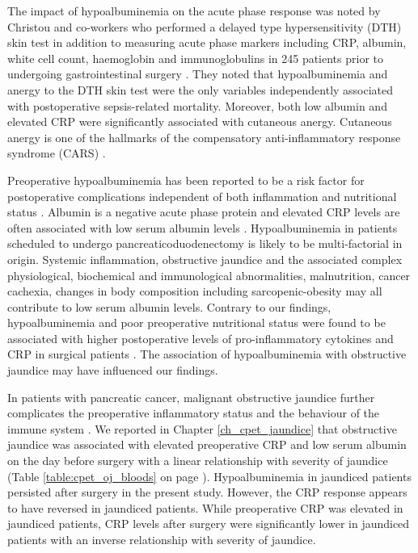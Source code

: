 The impact of hypoalbuminemia on the acute phase response was noted by Christou and co-workers who performed a delayed type hypersensitivity (DTH) skin test in addition to measuring acute phase markers including CRP, albumin, white cell count, haemoglobin and immunoglobulins in 245 patients prior to undergoing gastrointestinal surgery \parencite{christou_estimating_1989}.
They noted that hypoalbuminemia and anergy to the DTH skin test were the only variables independently associated with postoperative sepsis-related mortality.
Moreover, both low albumin and elevated CRP were significantly associated with cutaneous anergy.
Cutaneous anergy is one of the hallmarks of the compensatory anti-inflammatory response syndrome (CARS) \parencite{ward_compensatory_2008}.

Preoperative hypoalbuminemia has been reported to be a risk factor for postoperative complications independent of both inflammation and nutritional status \parencite{gibbs_preoperative_1999, don_poor_2004, hennessey_preoperative_2010}.
Albumin is a negative acute phase protein and elevated CRP levels are often associated with low serum albumin levels \parencite{margarson_serum_1998}. 
Hypoalbuminemia in patients scheduled to undergo pancreaticoduodenectomy is likely to be multi-factorial in origin. 
Systemic inflammation, obstructive jaundice and the associated complex physiological, biochemical and immunological abnormalities, malnutrition, cancer cachexia, changes in body composition including sarcopenic-obesity may all contribute to low serum albumin levels. 
Contrary to our findings, hypoalbuminemia and poor preoperative nutritional status were found to be associated with higher postoperative levels of pro-inflammatory cytokines and CRP in surgical patients \parencite{nakamura_influence_1999}.
The association of hypoalbuminemia with obstructive jaundice may have influenced our findings. 

In patients with pancreatic cancer, malignant obstructive jaundice further complicates the preoperative inflammatory status and the behaviour of the immune system \parencite{nehez_compromise_2002}. 
We reported in Chapter \ref{ch_cpet_jaundice} that obstructive jaundice was associated with elevated preoperative CRP and low serum albumin on the day before surgery with a linear relationship with severity of jaundice (Table \ref{table:cpet_oj_bloods} on page \pageref{table:cpet_oj_bloods}).
Hypoalbuminemia in jaundiced patients persisted after surgery in the present study.
However, the CRP response appears to have reversed in jaundiced patients.
While preoperative CRP was elevated in jaundiced patients, CRP levels after surgery were significantly lower in jaundiced patients with an inverse relationship with severity of jaundice.

